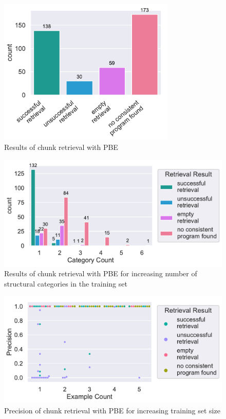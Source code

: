 \documentclass[\myrootdir/main.tex]{subfiles}
\begin{document}
\begin{figure}[htbp]
		\centering
		\includegraphics[width=0.75\textwidth, clip]{img/big-study/failure-reason-PBE.pdf}
		\caption{Results of chunk retrieval with PBE}
		\label{fig:failure-reason-PBE}
\end{figure}

\begin{figure}[htbp]
		\centering
		\includegraphics[width=\textwidth, clip]{img/big-study/failure-reason-categorycount-PBE.pdf}
		\caption{Results of chunk retrieval with PBE for increasing number of structural categories in the training set}
		\label{fig:failure-reason-categorycount-PBE}
\end{figure}

\begin{figure}[htbp]
		\centering
		\includegraphics[width=\textwidth, clip]{img/big-study/precision-extraction-result-PBE.pdf}
		\caption{Precision of chunk retrieval with PBE for increasing training set size}
		\label{fig:precision-extraction-result-PBE}
\end{figure}
\end{document}
